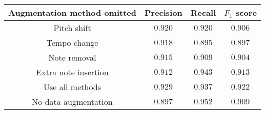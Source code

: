 \begin{tabular}{cccc}
    \textbf{Augmentation method omitted} & Precision & Recall  & $F_1$ score      \\\hline
    Pitch shift                          & $0.920$   & $0.920$ & $0.906$          \\
    Tempo change                         & $0.918$   & $0.895$ & $0.897$          \\
    Note removal                         & $0.915$   & $0.909$ & $0.904$          \\
    Extra note insertion                 & $0.912$   & $0.943$ & $0.913$          \\
    Use all methods                      & $0.929$   & $0.937$ & $\mathbf{0.922}$ \\
    No data augmentation                 & $0.897$   & $0.952$ & $0.909$
\end{tabular}

